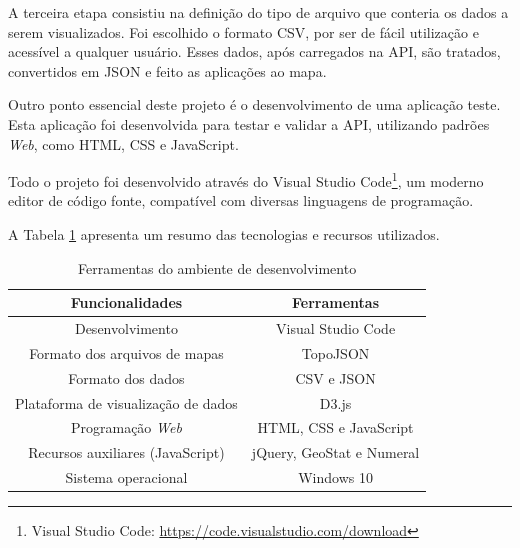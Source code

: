 \documentclass[12pt]{article}
\begin{document}
A terceira etapa consistiu na definição do tipo de arquivo que conteria os dados a serem visualizados. Foi escolhido o formato CSV, por ser de fácil utilização e acessível a qualquer usuário. Esses dados, após carregados na API, são tratados, convertidos em JSON e feito as aplicações ao mapa.

Outro ponto essencial deste projeto é o desenvolvimento de uma aplicação teste. Esta aplicação foi desenvolvida para testar e validar a API, utilizando padrões \textit{Web}, como HTML, CSS e JavaScript.

Todo o projeto foi desenvolvido através do Visual Studio Code\footnote{Visual Studio Code: \href{https://code.visualstudio.com/download}{https://code.visualstudio.com/download}}, um moderno editor de código fonte, compatível com diversas linguagens de programação.%

A Tabela \ref{tabtecnologias} apresenta um resumo das tecnologias e recursos utilizados.

\begin{table}[!htbp]
	\centering
    \caption{Ferramentas do ambiente de desenvolvimento}
	\begin{tabular}{|c|c|}
    \hline
    \multicolumn{1}{|c|}{{\cellcolor[rgb]{.75, .75, .75} \textbf{Funcionalidades}}} & \multicolumn{1}{|c|}{{\cellcolor[rgb]{.75, .75, .75} \textbf{Ferramentas}}}
    \tabularnewline \hline  
      Desenvolvimento & Visual Studio Code \tabularnewline \hline
      Formato dos arquivos de mapas & TopoJSON \tabularnewline \hline
      Formato dos dados & CSV e JSON \tabularnewline \hline
      Plataforma de visualização de dados & D3.js \tabularnewline \hline
      Programação \emph{Web} & HTML, CSS e JavaScript \tabularnewline \hline
      Recursos auxiliares (JavaScript) & jQuery, GeoStat e Numeral \tabularnewline \hline
      Sistema operacional & Windows 10 \tabularnewline \hline
	\end{tabular}
    \label{tabtecnologias}
\end{table} 
\end{document}
